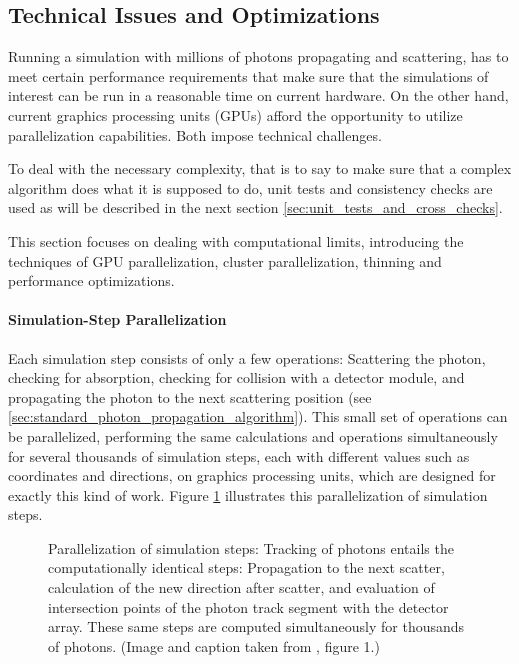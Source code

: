 
\subsection{Technical Issues and Optimizations}
\label{sec:technical_issues_and_optimizations}

Running a simulation with millions of photons propagating and scattering, has to meet certain performance requirements that make sure that the simulations of interest can be run in a reasonable time on current hardware. On the other hand, current graphics processing units (GPUs) afford the opportunity to utilize parallelization capabilities. Both impose technical challenges.

To deal with the necessary complexity, that is to say to make sure that a complex algorithm does what it is supposed to do, unit tests and consistency checks are used as will be described in the next section \ref{sec:unit_tests_and_cross_checks}.

This section focuses on dealing with computational limits, introducing the techniques of GPU parallelization, cluster parallelization, thinning and performance optimizations.


\paragraph{Simulation-Step Parallelization}
Each simulation step consists of only a few operations: Scattering the photon, checking for absorption, checking for collision with a detector module, and propagating the photon to the next scattering position (see \ref{sec:standard_photon_propagation_algorithm}). This small set of operations can be parallelized, performing the same calculations and operations simultaneously for several thousands of simulation steps, each with different values such as coordinates and directions, on graphics processing units, which are designed for exactly this kind of work. Figure \ref{fig:Id3ioyie} illustrates this parallelization of simulation steps.

\begin{figure}[htbp]
  \caption{Parallelization of simulation steps: Tracking of photons entails the computationally identical steps: Propagation to the next scatter, calculation of the new direction after scatter, and evaluation of intersection points of the photon track segment with the detector array. These same steps are computed simultaneously for thousands of photons. (Image and caption taken from \cite{ppcpaper}, figure 1.)}
  \label{fig:Id3ioyie}
\end{figure}

